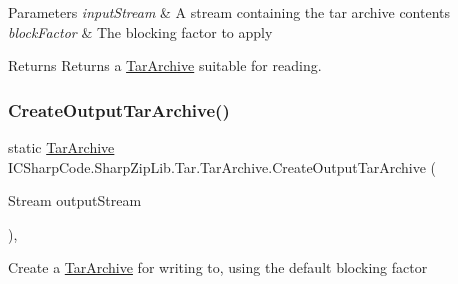 \begin{DoxyParams}{Parameters}
{\em input\+Stream} & A stream containing the tar archive contents\\
\hline
{\em block\+Factor} & The blocking factor to apply\\
\hline
\end{DoxyParams}
\begin{DoxyReturn}{Returns}
Returns a \hyperlink{class_i_c_sharp_code_1_1_sharp_zip_lib_1_1_tar_1_1_tar_archive}{Tar\+Archive} suitable for reading.
\end{DoxyReturn}
\mbox{\label{class_i_c_sharp_code_1_1_sharp_zip_lib_1_1_tar_1_1_tar_archive_a7dbd5d874623ea87aa9c42af63f4f874}} 
\subsubsection{\texorpdfstring{Create\+Output\+Tar\+Archive()}{CreateOutputTarArchive()}\hspace{0.1cm}{\footnotesize\ttfamily [1/2]}}
{\footnotesize\ttfamily static \hyperlink{class_i_c_sharp_code_1_1_sharp_zip_lib_1_1_tar_1_1_tar_archive}{Tar\+Archive} I\+C\+Sharp\+Code.\+Sharp\+Zip\+Lib.\+Tar.\+Tar\+Archive.\+Create\+Output\+Tar\+Archive (\begin{DoxyParamCaption}\item[{Stream}]{output\+Stream }\end{DoxyParamCaption})\hspace{0.3cm}{\ttfamily [inline]}, {\ttfamily [static]}}



Create a \hyperlink{class_i_c_sharp_code_1_1_sharp_zip_lib_1_1_tar_1_1_tar_archive}{Tar\+Archive} for writing to, using the default blocking factor 


